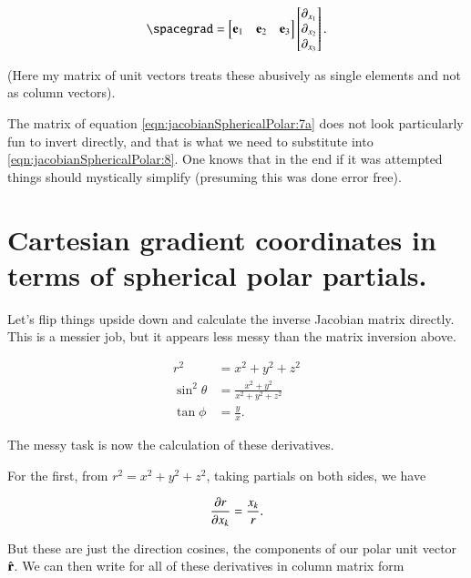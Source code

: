 \begin{align}\label{eqn:jacobianSphericalPolar:8}
\spacegrad = 
\begin{bmatrix}
\Be_1 & \Be_2 & \Be_3  
\end{bmatrix}
\begin{bmatrix}
\partial_{x_1} \\
\partial_{x_2} \\
\partial_{x_3}
\end{bmatrix}.
\end{align}

(Here my matrix of unit vectors treats these abusively as single elements and not as column vectors).

The matrix of equation \ref{eqn:jacobianSphericalPolar:7a} does not look particularly fun to invert directly, and that is what we need to substitute into
\ref{eqn:jacobianSphericalPolar:8}.  One knows that in the end if it was attempted things should mystically simplify (presuming this was done error free).

\section{Cartesian gradient coordinates in terms of spherical polar partials.}

Let's flip things upside down and calculate the inverse Jacobian matrix directly.  This is a messier job, but it appears less messy than the matrix inversion above.

\begin{subequations}\label{eqn:jacobianSphericalPolar:9}
\begin{align}
r^2 &= x^2 + y^2 + z^2  \\
\sin^2 \theta &= \frac{x^2 + y^2}{x^2 + y^2 + z^2} \\
\tan\phi &= \frac{y}{x}
.
\end{align}
\end{subequations}

The messy task is now the calculation of these derivatives.

For the first, from $r^2 = x^2 + y^2 + z^2$, taking partials on both sides, we have

\begin{align}\label{eqn:jacobianSphericalPolar:10}
\PD{x_k}{r} = \frac{x_k}{r}.
\end{align}

But these are just the direction cosines, the components of our polar unit vector $\rcap$.  We can then write for all of these derivatives in column matrix form

